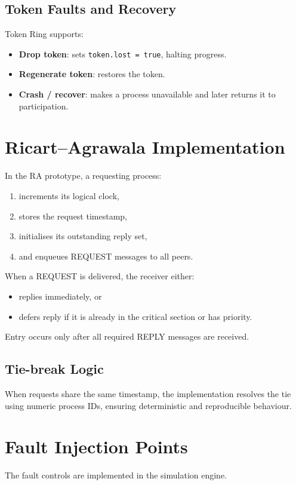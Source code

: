 \subsection{Token Faults and Recovery}
Token Ring supports:
\begin{itemize}
  \item \textbf{Drop token}: sets \texttt{token.lost = true}, halting progress.
  \item \textbf{Regenerate token}: restores the token.
  \item \textbf{Crash / recover}: makes a process unavailable and later returns it to participation.
\end{itemize}

\section{Ricart--Agrawala Implementation}
In the RA prototype, a requesting process:
\begin{enumerate}
  \item increments its logical clock,
  \item stores the request timestamp,
  \item initialises its outstanding reply set,
  \item and enqueues REQUEST messages to all peers.
\end{enumerate}

When a REQUEST is delivered, the receiver either:
\begin{itemize}
  \item replies immediately, or
  \item defers reply if it is already in the critical section or has priority.
\end{itemize}

Entry occurs only after all required REPLY messages are received.

\subsection{Tie-break Logic}
When requests share the same timestamp, the implementation resolves the tie using numeric process IDs, ensuring deterministic and reproducible behaviour.

\section{Fault Injection Points}
The fault controls are implemented in the simulation engine.

